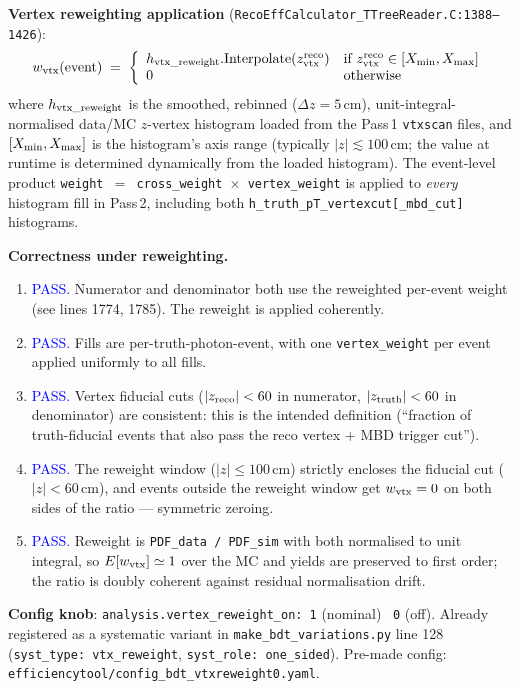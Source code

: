 \documentclass[11pt,a4paper]{article}
\begin{document}
\noindent\textbf{Vertex reweighting application} (\texttt{RecoEffCalculator\_TTreeReader.C:1388--1426}):
\[
  w_{\rm vtx}(\textrm{event}) \;=\; \left\{ \begin{array}{ll}
    h_{\rm vtx\_reweight}\mathrm{.Interpolate}(z_{\rm vtx}^{\rm reco}) & \text{if } z_{\rm vtx}^{\rm reco}\in[X_{\rm min},X_{\rm max}] \\
    0 & \text{otherwise}
  \end{array} \right.
\]
where $h_{\rm vtx\_reweight}$ is the smoothed, rebinned ($\Delta z = 5$\,cm), unit-integral-normalised data/MC $z$-vertex histogram loaded from the Pass\,1 \texttt{vtxscan} files, and $[X_{\rm min},X_{\rm max}]$ is the histogram's axis range (typically $|z|\lesssim 100$\,cm; the value at runtime is determined dynamically from the loaded histogram). The event-level product \texttt{weight $= $ cross\_weight $\times$ vertex\_weight} is applied to \emph{every} histogram fill in Pass\,2, including both \texttt{h\_truth\_pT\_vertexcut[\_mbd\_cut]} histograms.

\noindent\textbf{Correctness under reweighting.}
\begin{enumerate}
\item[(a)] \textcolor{blue}{PASS.} Numerator and denominator both use the reweighted per-event weight (see lines 1774, 1785). The reweight is applied coherently.
\item[(b)] \textcolor{blue}{PASS.} Fills are per-truth-photon-event, with one \texttt{vertex\_weight} per event applied uniformly to all fills.
\item[(c)] \textcolor{blue}{PASS.} Vertex fiducial cuts ($|z_{\rm reco}|<60$ in numerator, $|z_{\rm truth}|<60$ in denominator) are consistent: this is the intended definition (``fraction of truth-fiducial events that also pass the reco vertex + MBD trigger cut'').
\item[(d)] \textcolor{blue}{PASS.} The reweight window ($|z|\le 100$\,cm) strictly encloses the fiducial cut ($|z|<60$\,cm), and events outside the reweight window get $w_{\rm vtx}=0$ on both sides of the ratio --- symmetric zeroing.
\item[(e)] \textcolor{blue}{PASS.} Reweight is \texttt{PDF\_data / PDF\_sim} with both normalised to unit integral, so $E[w_{\rm vtx}]\simeq 1$ over the MC and yields are preserved to first order; the ratio is doubly coherent against residual normalisation drift.
\end{enumerate}

\noindent\textbf{Config knob}: \texttt{analysis.vertex\_reweight\_on: 1} (nominal) \textrightarrow\ \texttt{0} (off). Already registered as a systematic variant in \texttt{make\_bdt\_variations.py} line 128 (\texttt{syst\_type: vtx\_reweight}, \texttt{syst\_role: one\_sided}). Pre-made config: \texttt{efficiencytool/config\_bdt\_vtxreweight0.yaml}.
\end{document}
